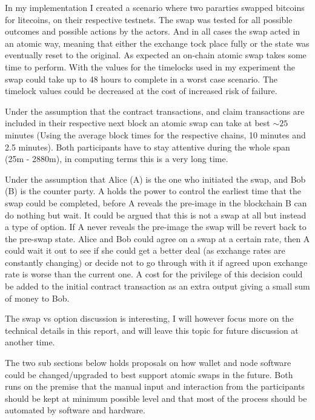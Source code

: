 In my implementation I created a scenario where two pararties swapped bitcoins for litecoins, on their respective testnets. 
The swap was tested for all possible outcomes and possible actions by the actors. And in all cases the swap acted in an atomic way, meaning that either the exchange tock place fully or the state was eventually reset to the original. 
As expected an on-chain atomic swap takes some time to perform. With the values for the timelocks used in my experiment the swap could take up to 48 hours to complete in a worst case scenario. The timelock values could be decreased at the cost of increased risk of failure. 

Under the assumption that the contract transactions, and claim transactions are included in their respective next block an atomic swap can take at best $\sim25$ minutes (Using the average block times for the respective chains, 10 minutes and 2.5 minutes). Both participants have to stay attentive during the whole span (25m - 2880m), in computing terms this is a very long time. 

Under the assumption that Alice (A) is the one who initiated the swap, and Bob (B) is the counter party. A holds the power to control the earliest time that the swap could be completed, before A reveals the pre-image in the blockchain B can do nothing but wait. It could be argued that this is not a swap at all but instead a type of option. If A never reveals the pre-image the swap will be revert back to the pre-swap state. Alice and Bob could agree on a swap at a certain rate, then A could wait it out to see if she could get a better deal (as exchange rates are constantly changing) or decide not to go through with it if agreed upon exchange rate is worse than the current one. A cost for the privilege of this decision could be added to the initial contract transaction as an extra output giving a small sum of money to Bob. 

The swap vs option discussion is interesting, I will however focus more on the technical details in this report, and will leave this topic for future discussion at another time. 

The two sub sections below holds proposals on how wallet and node software could be changed/upgraded to best support atomic swaps in the future. Both runs on the premise that the manual input and interaction from the participants should be kept at minimum possible level and that most of the process should be automated by software and hardware.

